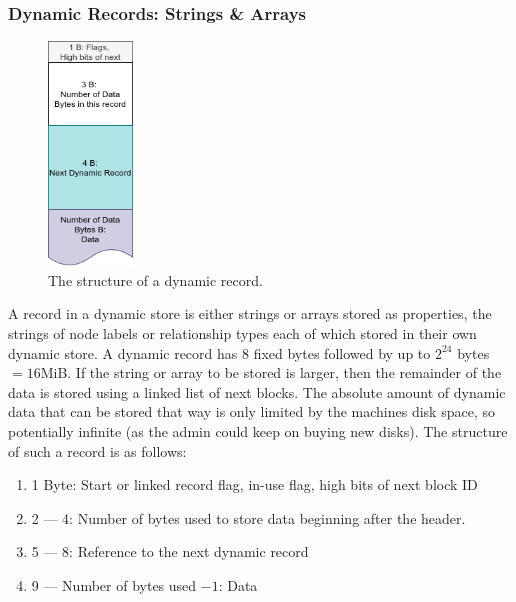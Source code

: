 \documentclass[a4paper,10pt]{article}
\begin{document}
        \subsubsection{Dynamic Records: Strings \& Arrays}\label{dynamic}
            \begin{figure}[htp]\label{dynamic_rec}
                \begin{center}
                    \includegraphics[keepaspectratio,height=0.2\textheight,width=0.2\textwidth]{img/03_record/dynamic.png}
                \end{center}
                \caption{The structure of a dynamic record.} 
            \end{figure}
            A record in a dynamic store is either strings or arrays stored as properties,  the strings of node labels or relationship types each of which stored in their own dynamic store.
            A dynamic record has 8 fixed bytes followed by up to $2^{24}$ bytes $= 16 $MiB.
            If the string or array to be stored is larger, then the remainder of the data is stored using a linked list of next blocks.
            The absolute amount of dynamic data that can be stored that way is only limited by the machines disk space, so potentially infinite (as the admin could keep on buying new disks). 
            The structure of such a record is as follows:
            \begin{enumerate}
                \item 1 Byte: Start or linked record flag, in-use flag, high bits of next block ID
                \item 2 --- 4: Number of bytes used to store data beginning after the header.
                \item 5 --- 8: Reference to the next dynamic record
                \item 9 --- Number of bytes used $- 1$: Data
            \end{enumerate}
            
\end{document}
